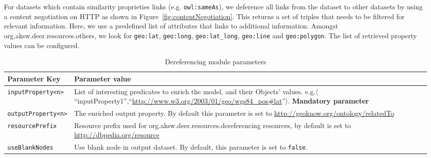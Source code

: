 \documentclass[a4paper,twoside,bibtotoc,abstracton,12pt,BCOR=15mm]{article}
\begin{document}
    For datasets which contain similarity proprieties links (e.g. \texttt{owl:sameAs}), we deference all links from the dataset to other datasets by using a content negotiation on HTTP as shown in Figure~\ref{fig:contentNegotiation}.
    This returns a set of triples that needs to be filtered for relevant information.
    Here, we use a predefined list of attributes that links to additional information.
    Amongst org.aksw.deer.resources.others, we look for \texttt{geo:lat}, \texttt{geo:long}, \texttt{geo:lat\_long}, \texttt{geo:line} and \texttt{geo:polygon}.
    The list of retrieved property values can be configured.


    \begin{table}
    \caption{Dereferencing module parameters} \label{tbl:derefPram}
    \small
    \begin{tabularx}{\textwidth}{@{}lX@{}}
    \toprule
    \textbf{Parameter Key} 		& \textbf{Parameter value}\\
    \toprule
    \texttt{inputProperty<n>} 	& List of interesting predicates to enrich the model, and their Objects' values. e.g.$\langle$``inputProperty1'',``\url{http://www.w3.org/2003/01/geo/wgs84_pos#lat}''$\rangle$. \textbf{Mandatory parameter}\\
    \midrule
    \texttt{outputProperty<n>} 	& The enriched output property. By default this parameter is set to \url{http://geoknow.org/ontology/relatedTo}\\
    \midrule
    \texttt{resourcePrefix} 	& Resource prefix used for org.aksw.deer.resources.dereferencing resources, by default is set to \url{http://dbpedia.org/resource}\\
    \midrule
    \texttt{useBlankNodes}		& Use blank node in output dataset. By default, this parameter is set to \texttt{false}.\\
    \bottomrule
    \end{tabularx}
    \end{table}
    
\end{document}
